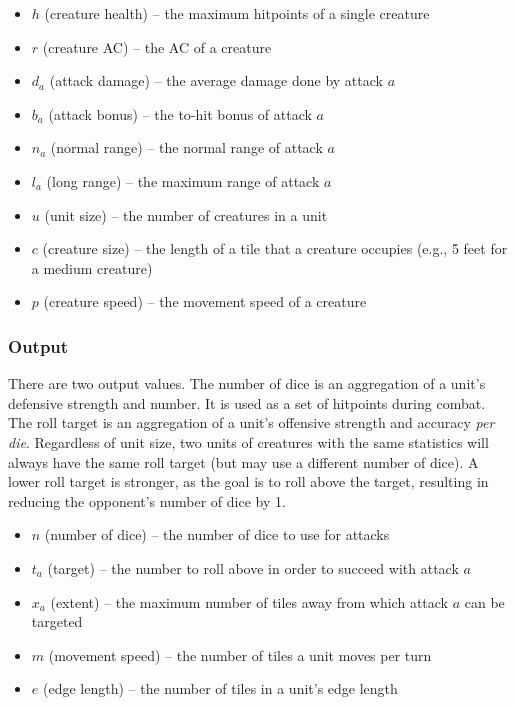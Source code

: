 \documentclass[twocolumn]{article}
\begin{document}
\begin{itemize}
    \item $h$ (creature health) -- the maximum hitpoints of a single creature
    \item $r$ (creature AC) -- the AC of a creature
    \item $d_a$ (attack damage) -- the average damage done by attack $a$
    \item $b_a$ (attack bonus) -- the to-hit bonus of attack $a$
    \item $n_a$ (normal range) -- the normal range of attack $a$
    \item $l_a$ (long range) -- the maximum range of attack $a$
    \item $u$ (unit size) -- the number of creatures in a unit
    \item $c$ (creature size) -- the length of a tile that a creature occupies
        (e.g., 5 feet for a medium creature)
    \item $p$ (creature speed) -- the movement speed of a creature
\end{itemize}

\subsubsection{Output}

There are two output values.
The number of dice is an aggregation of a unit's defensive strength and number.
It is used as a set of hitpoints during combat.
The roll target is an aggregation
of a unit's offensive strength and accuracy \emph{per die}.
Regardless of unit size,
two units of creatures with the same statistics
will always have the same roll target
(but may use a different number of dice).
A lower roll target is stronger,
as the goal is to roll above the target,
resulting in reducing the opponent's number of dice by 1.

\begin{itemize}
    \item $n$ (number of dice) -- the number of dice to use for attacks
    \item $t_a$ (target) -- the number to roll above in order to succeed with attack $a$
    \item $x_a$ (extent) -- the maximum number of tiles away from which attack $a$ can be targeted
    \item $m$ (movement speed) -- the number of tiles a unit moves per turn
    \item $e$ (edge length) -- the number of tiles in a unit's edge length
\end{itemize}
\end{document}
